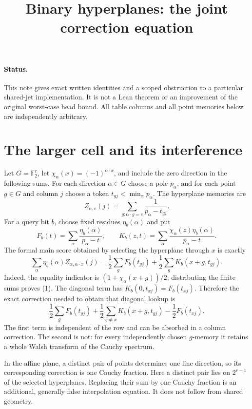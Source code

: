 \documentclass{article}
\begin{document}
\title{Binary hyperplanes: the joint correction equation}
\maketitle

\paragraph{Status.}
This note gives exact written identities and a scoped obstruction to a
particular shared-jet implementation.  It is not a Lean theorem or an
improvement of the original worst-case head bound.  All table columns
and all point memories below are independently arbitrary.

\section{The larger cell and its interference}

Let $G=\mathbb F_2^r$, let $\chi_\alpha(x)=(-1)^{\alpha\cdot x}$,
and include the zero direction in the following sums.  For each
direction $\alpha\in G$ choose a pole $p_\alpha$, and for each point
$g\in G$ and column $j$ choose a token $t_{gj}<\min_\alpha p_\alpha$.
The hyperplane memories are
\[
 Z_{\alpha,e}(j)=\sum_{g:\alpha\cdot g=e}
             \frac{1}{p_\alpha-t_{gj}}.
\]
For a query bit $b$, choose fixed residues $\eta_b(\alpha)$ and put
\[
 F_b(t)=\sum_\alpha\frac{\eta_b(\alpha)}{p_\alpha-t},
 \qquad
 K_b(z,t)=\sum_\alpha\frac{\chi_\alpha(z)\eta_b(\alpha)}
                                      {p_\alpha-t}.
\]
The formal main score obtained by selecting the hyperplane through $x$
is exactly
\[
 \sum_\alpha\eta_b(\alpha)Z_{\alpha,\alpha\cdot x}(j)
 =\frac12\sum_g F_b(t_{gj})
  +\frac12\sum_g K_b(x+g,t_{gj}).                 \tag{1}
\]
Indeed, the equality indicator is
$(1+\chi_\alpha(x+g))/2$; distributing the finite sums proves (1).
The diagonal term has $K_b(0,t_{xj})=F_b(t_{xj})$.  Therefore the
exact correction needed to obtain that diagonal lookup is
\[
 \frac12\sum_g F_b(t_{gj})
 +\frac12\sum_{g\ne x}K_b(x+g,t_{gj})
 -\frac12 F_b(t_{xj}).                           \tag{2}
\]
The first term is independent of the row and can be absorbed in a
column correction.  The second is not: for every independently chosen
$g$-memory it retains a whole Walsh transform of the Cauchy spectrum.

In the affine plane, a distinct pair of points determines one line
direction, so its corresponding correction is one Cauchy fraction.
Here a distinct pair lies on $2^{r-1}$ of the selected hyperplanes.
Replacing their sum by one Cauchy fraction is an additional, generally
false interpolation equation.  It does not follow from shared geometry.
\end{document}
